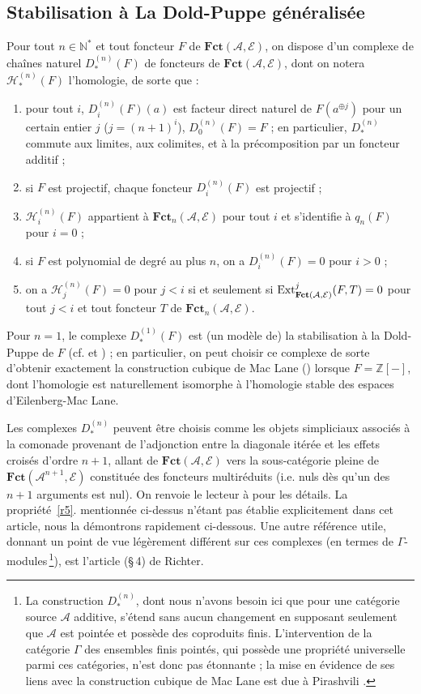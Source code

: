 \documentclass[a4paper,10pt]{article}
\newcommand{\A}{{\mathcal{A}}}
\newcommand{\fct}{\mathbf{Fct}}
\newcommand{\Hh}{{\mathcal{H}}}
\newcommand{\E}{{\mathcal{E}}}
\newcommand{\Pol}{\fct}
\theoremstyle{definition}
\theoremstyle{remark}
\begin{document}
\subsection{Stabilisation à La Dold-Puppe généralisée}\label{pdp}

Pour tout $n\in\mathbb{N}^*$ et tout foncteur $F$ de $\fct(\A,\E)$, on dispose d'un complexe de chaînes naturel $D^{(n)}_*(F)$ de foncteurs de $\fct(\A,\E)$, dont on notera $\Hh^{(n)}_*(F)$ l'homologie, de sorte que :
\begin{enumerate}
 \item\label{r1} pour tout $i$, $D^{(n)}_i(F)(a)$ est facteur direct naturel de $F(a^{\oplus j})$ pour un certain entier $j$ ($j=(n+1)^i$), $D^{(n)}_0(F)=F$ ; en particulier, $D^{(n)}_*$ commute aux limites, aux colimites, et à la précomposition par un foncteur additif ;
\item si $F$ est projectif, chaque foncteur $D^{(n)}_i(F)$ est projectif ;
\item $\Hh^{(n)}_i(F)$ appartient à $\Pol_n(\A,\E)$ pour tout $i$ et  s'identifie à $q_n(F)$ pour $i=0$ ;
\item si $F$ est polynomial de degré au plus $n$, on a $D^{(n)}_i(F)=0$ pour $i>0$ ;
\item\label{r5} on a $\Hh^{(n)}_j(F)=0$ pour $j<i$ si et seulement si  ${\rm Ext}^j_{\fct(\A,\E)}(F,T)=0$ pour tout $j<i$ et tout foncteur $T$ de $\Pol_n(\A,\E)$.
\end{enumerate}

Pour $n=1$, le complexe $D^{(1)}_*(F)$ est (un modèle de) la stabilisation à la Dold-Puppe de $F$ (cf. \cite{DP} et \cite{JMC}) ; en particulier, 
on peut choisir ce complexe de sorte d'obtenir exactement la construction cubique de Mac Lane (\cite{HML}) lorsque $F=\mathbb{Z}[-]$, dont l'homologie est naturellement isomorphe à l'homologie stable des espaces d'Eilenberg-Mac Lane.

Les complexes $D^{(n)}_*$ peuvent être choisis comme les objets simpliciaux associés à la comonade provenant de l'adjonction entre la diagonale itérée et les effets croisés d'ordre $n+1$, allant de $\fct(\A,\E)$ vers la sous-catégorie pleine de $\fct(\A^{n+1},\E)$ constituée des foncteurs multiréduits (i.e. nuls dès qu'un des $n+1$ arguments est nul). On renvoie le lecteur à \cite{JM-cotr} pour les détails. La propriété~\ref{r5}. mentionnée ci-dessus n'étant pas établie explicitement dans cet article, nous la démontrons rapidement ci-dessous. Une autre référence utile, donnant un point de vue légèrement différent sur ces complexes (en termes de $\Gamma$-modules\,\footnote{La construction $D^{(n)}_*$, dont nous n'avons besoin ici que pour une catégorie source $\A$ additive, s'étend sans aucun changement en supposant seulement que $\A$ est pointée et possède des coproduits finis. L'intervention de la catégorie $\Gamma$ des ensembles finis pointés, qui possède une propriété universelle parmi ces catégories, n'est donc pas étonnante ; la mise en évidence de ses liens avec la construction cubique de Mac Lane est due à Pirashvili \cite{P96}.}), est l'article \cite{Ric} (§\,4) de Richter.
\end{document}
